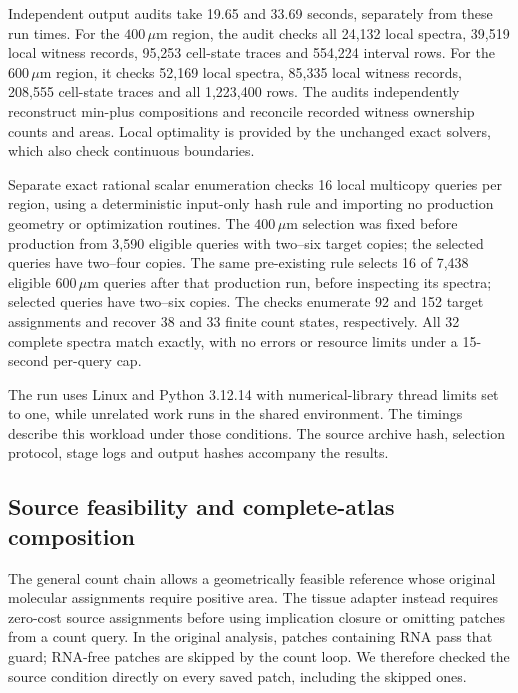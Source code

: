 \documentclass[10pt,letterpaper]{article}
\begin{document}
Independent output audits take 19.65 and 33.69 seconds, separately from these run times. For the $400\,\mu\mathrm m$ region, the audit checks all 24,132 local spectra, 39,519 local witness records, 95,253 cell-state traces and 554,224 interval rows. For the $600\,\mu\mathrm m$ region, it checks 52,169 local spectra, 85,335 local witness records, 208,555 cell-state traces and all 1,223,400 rows. The audits independently reconstruct min-plus compositions and reconcile recorded witness ownership counts and areas. Local optimality is provided by the unchanged exact solvers, which also check continuous boundaries.

Separate exact rational scalar enumeration checks 16 local multicopy queries per region, using a deterministic input-only hash rule and importing no production geometry or optimization routines. The $400\,\mu\mathrm m$ selection was fixed before production from 3,590 eligible queries with two--six target copies; the selected queries have two--four copies. The same pre-existing rule selects 16 of 7,438 eligible $600\,\mu\mathrm m$ queries after that production run, before inspecting its spectra; selected queries have two--six copies. The checks enumerate 92 and 152 target assignments and recover 38 and 33 finite count states, respectively. All 32 complete spectra match exactly, with no errors or resource limits under a 15-second per-query cap.

The run uses Linux and Python 3.12.14 with numerical-library thread limits set to one, while unrelated work runs in the shared environment. The timings describe this workload under those conditions. The source archive hash, selection protocol, stage logs and output hashes accompany the results.

\clearpage
\subsection{Source feasibility and complete-atlas composition}\label{sec:source-composition}
The general count chain allows a geometrically feasible reference whose original molecular assignments require positive area. The tissue adapter instead requires zero-cost source assignments before using implication closure or omitting patches from a count query. In the original analysis, patches containing RNA pass that guard; RNA-free patches are skipped by the count loop. We therefore checked the source condition directly on every saved patch, including the skipped ones.
\end{document}
